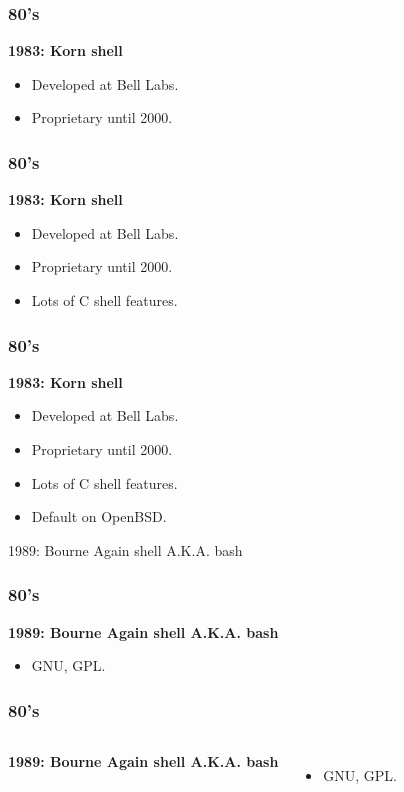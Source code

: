 \documentclass[aspectratio=169]{beamer}
\begin{document}
\begin{frame}
	\frametitle{ 80's}
	\textbf{1983: Korn shell}
	\begin{itemize}
		\item Developed at Bell Labs.
		\item Proprietary until 2000.
	\end{itemize}
\end{frame}

\begin{frame}
	\frametitle{ 80's}
	\textbf{1983: Korn shell}
	\begin{itemize}
		\item Developed at Bell Labs.
		\item Proprietary until 2000.
		\item Lots of C shell features.
	\end{itemize}
\end{frame}

\begin{frame}
	\frametitle{ 80's}
	\textbf{1983: Korn shell}
	\begin{itemize}
		\item Developed at Bell Labs.
		\item Proprietary until 2000.
		\item Lots of C shell features.
		\item Default on OpenBSD.
	\end{itemize}
\end{frame}


\begin{frame}
    \Huge{\centerline{1989: Bourne Again shell A.K.A. bash}}
\end{frame}

\begin{frame}
	\frametitle{ 80's}
	\textbf{1989: Bourne Again shell A.K.A. bash}
	\begin{itemize}
		\item GNU, GPL.
	\end{itemize}
\end{frame}

\begin{frame}
	\frametitle{ 80's}
	\begin{columns}[c]
			\textbf{1989: Bourne Again shell A.K.A. bash}
				\begin{itemize}
					\item GNU, GPL.
				\end{itemize}
			\begin{figure}[h!]
			\end{figure}		
	\end{columns}
\end{frame}
\end{document}

